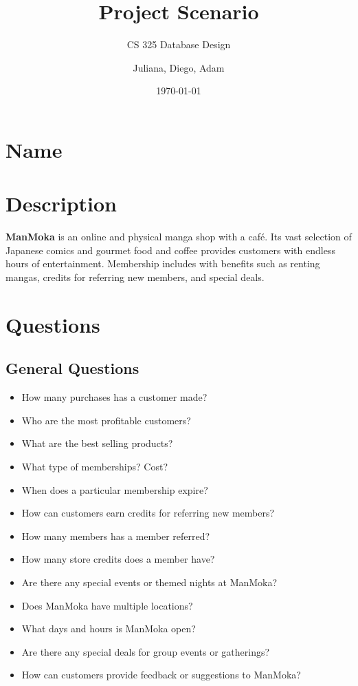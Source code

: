\documentclass{scrartcl}
\title{Project Scenario}
\subtitle{CS 325 Database Design}
\author{Juliana, Diego, Adam}
\date{\today}
\begin{document}
\maketitle

\section*{Name}
\begin{center}
\end{center}

\section*{Description}
\textbf{ManMoka} is an online and physical manga shop with a café. Its vast selection of Japanese comics and gourmet food and coffee provides customers with endless hours of entertainment. Membership includes with benefits such as renting mangas, credits for referring new members, and special deals.



\section*{Questions}

\subsection*{General Questions}
\begin{itemize}
\item How many purchases has a customer made?
\item Who are the most profitable customers?
\item What are the best selling products?
\item What type of memberships? Cost?
\item When does a particular membership expire?
\item How can customers earn credits for referring new members?
\item How many members has a member referred?
\item How many store credits does a member have?
\item Are there any special events or themed nights at ManMoka?
\item Does ManMoka have multiple locations?
\item What days and hours is ManMoka open?
\item Are there any special deals for group events or gatherings?
\item How can customers provide feedback or suggestions to ManMoka?
\end{itemize}
\end{document}
